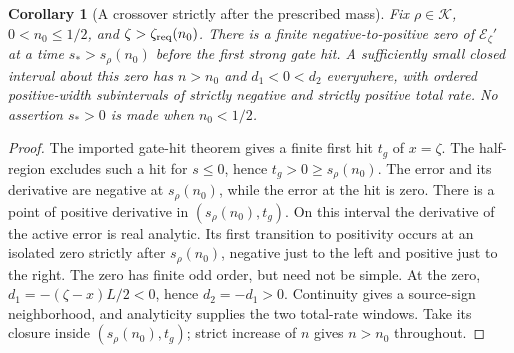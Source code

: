 \documentclass[11pt]{article}
\numberwithin{equation}{section}
\newtheorem{corollary}[theorem]{Corollary}
\theoremstyle{remark}\newtheorem{remark}[theorem]{Remark}
\newcommand{\1}{\mathbf 1}
\begin{document}
\begin{corollary}[A crossover strictly after the prescribed mass]
\label{inc:AN06:v2:postthreshold}
Fix $\rho\in\mathcal K$, $0<n_0\le1/2$, and
$\zeta>\zeta_{\rm req}(n_0)$.
There is a finite negative-to-positive zero of $\mathcal E_\zeta'$ at a
time $s_*>s_\rho(n_0)$ before the first strong gate hit.
A sufficiently small closed interval about this zero has $n>n_0$ and
$d_1<0<d_2$ everywhere, with ordered positive-width subintervals of
strictly negative and strictly positive total rate.
No assertion $s_*>0$ is made when $n_0<1/2$.
\end{corollary}
\begin{proof}
The imported gate-hit theorem gives a finite first hit $t_g$ of $x=\zeta$.
The half-region excludes such a hit for $s\le0$, hence
$t_g>0\ge s_\rho(n_0)$.
The error and its derivative are negative at $s_\rho(n_0)$, while the
error at the hit is zero. There is a point of positive derivative in
$(s_\rho(n_0),t_g)$.
On this interval the derivative of the active error is real analytic.
Its first transition to positivity occurs at an isolated zero strictly
after $s_\rho(n_0)$, negative just to the left and positive just to the
right. The zero has finite odd order, but need not be simple.
At the zero, $d_1=-(\zeta-x)L/2<0$, hence $d_2=-d_1>0$.
Continuity gives a source-sign neighborhood, and analyticity supplies
the two total-rate windows. Take its closure inside
$(s_\rho(n_0),t_g)$; strict increase of $n$ gives $n>n_0$ throughout.
\end{proof}
\end{document}
